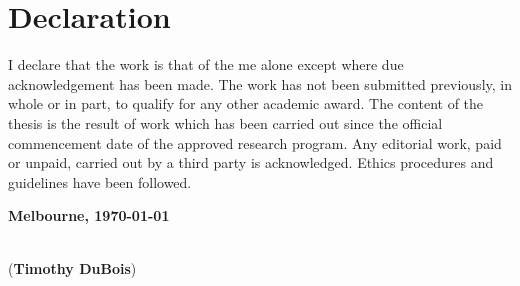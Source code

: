\chapter{Declaration}

I declare that the work is that of the me alone except where due acknowledgement has been made. The work has not been submitted previously, in whole or in part, to qualify for any other academic award. The content of the thesis is the result of work which has been carried out since the official commencement date of the approved research program. Any editorial work, paid or unpaid, carried out by a third party is acknowledged. Ethics procedures and guidelines have been followed.


\textbf{Melbourne, \today}
\vspace{1.5cm}

\dotfill\hspace*{6.5cm}\\
\hspace*{2cm}(\textbf{Timothy DuBois}) %